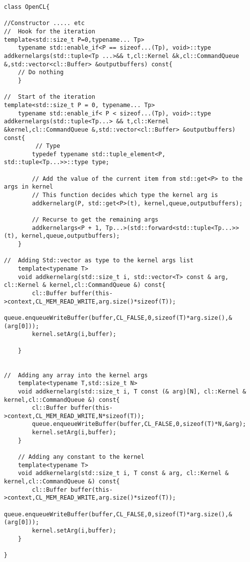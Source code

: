 \documentclass{acm_proc_article-sp}
\begin{document}
\begin{lstlisting}[caption=Add arguments to kernel dynamic way]
class OpenCL{

//Constructor ..... etc
//	Hook for the iteration
template<std::size_t P=0,typename... Tp>
	typename std::enable_if<P == sizeof...(Tp), void>::type addkernelargs(std::tuple<Tp ...>&& t,cl::Kernel &k,cl::CommandQueue &,std::vector<cl::Buffer> &outputbuffers) const{
	// Do nothing
	}
	
//  Start of the iteration
template<std::size_t P = 0, typename... Tp>
	typename std::enable_if< P < sizeof...(Tp), void>::type addkernelargs(std::tuple<Tp...> && t,cl::Kernel &kernel,cl::CommandQueue &,std::vector<cl::Buffer> &outputbuffers) const{
		 // Type
        typedef typename std::tuple_element<P, std::tuple<Tp...>>::type type;

        // Add the value of the current item from std::get<P> to the args in kernel
        // This function decides which type the kernel arg is
        addkernelarg(P, std::get<P>(t), kernel,queue,outputbuffers);

        // Recurse to get the remaining args
        addkernelargs<P + 1, Tp...>(std::forward<std::tuple<Tp...>>(t), kernel,queue,outputbuffers);
	}
	
//	Adding Std::vector as type to the kernel args list
	template<typename T>
	void addkernelarg(std::size_t i, std::vector<T> const & arg, cl::Kernel & kernel,cl::CommandQueue &) const{
		cl::Buffer buffer(this->context,CL_MEM_READ_WRITE,arg.size()*sizeof(T));
		queue.enqueueWriteBuffer(buffer,CL_FALSE,0,sizeof(T)*arg.size(),&(arg[0]));
		kernel.setArg(i,buffer);
	
	}


//	Adding any array into the kernel args
	template<typename T,std::size_t N>
	void addkernelarg(std::size_t i, T const (& arg)[N], cl::Kernel & kernel,cl::CommandQueue &) const{
		cl::Buffer buffer(this->context,CL_MEM_READ_WRITE,N*sizeof(T));
		queue.enqueueWriteBuffer(buffer,CL_FALSE,0,sizeof(T)*N,&arg);
		kernel.setArg(i,buffer);
	}
	
	// Adding any constant to the kernel
	template<typename T>
	void addkernelarg(std::size_t i, T const & arg, cl::Kernel & kernel,cl::CommandQueue &) const{
		cl::Buffer buffer(this->context,CL_MEM_READ_WRITE,arg.size()*sizeof(T));
		queue.enqueueWriteBuffer(buffer,CL_FALSE,0,sizeof(T)*arg.size(),&(arg[0]));
		kernel.setArg(i,buffer);
	}

}
\end{lstlisting}
\end{document}
